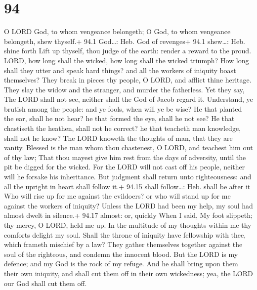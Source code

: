 \hypertarget{section-93}{%
\section{94}\label{section-93}}

 O LORD God, to whom vengeance belongeth; O God, to whom
vengeance belongeth, shew thyself.+ 94.1 God\ldots: Heb. God of
revenges+ 94.1 shew\ldots: Heb. shine forth  Lift up
thyself, thou judge of the earth: render a reward to the proud.
 LORD, how long shall the wicked, how long shall the wicked
triumph?  How long shall they utter and speak hard things?
and all the workers of iniquity boast themselves?  They
break in pieces thy people, O LORD, and afflict thine heritage.
 They slay the widow and the stranger, and murder the
fatherless.  Yet they say, The LORD shall not see, neither
shall the God of Jacob regard it.  Understand, ye brutish
among the people: and ye fools, when will ye be wise?  He
that planted the ear, shall he not hear? he that formed the eye, shall
he not see?  He that chastiseth the heathen, shall not he
correct? he that teacheth man knowledge, shall not he know?
 The LORD knoweth the thoughts of man, that they are
vanity.  Blessed is the man whom thou chastenest, O LORD,
and teachest him out of thy law;  That thou mayest give him
rest from the days of adversity, until the pit be digged for the wicked.
 For the LORD will not cast off his people, neither will he
forsake his inheritance.  But judgment shall return unto
righteousness: and all the upright in heart shall follow it.+ 94.15
shall follow\ldots: Heb. shall be after it  Who will rise
up for me against the evildoers? or who will stand up for me against the
workers of iniquity?  Unless the LORD had been my help, my
soul had almost dwelt in silence.+ 94.17 almost: or, quickly
 When I said, My foot slippeth; thy mercy, O LORD, held me
up.  In the multitude of my thoughts within me thy comforts
delight my soul.  Shall the throne of iniquity have
fellowship with thee, which frameth mischief by a law? 
They gather themselves together against the soul of the righteous, and
condemn the innocent blood.  But the LORD is my defence;
and my God is the rock of my refuge.  And he shall bring
upon them their own iniquity, and shall cut them off in their own
wickedness; yea, the LORD our God shall cut them off.

